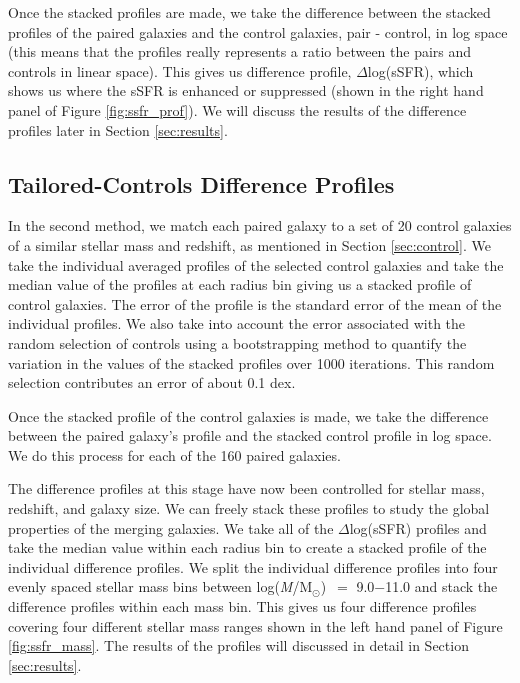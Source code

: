 \documentclass[iop,revtex4,twocolumn,apj,numberedappendix,appendixfloats]{emulateapj}
\newcommand{\logm}{log({\it M}/M$_{\odot}$)}
\begin{document}
Once the stacked profiles are made, we take the difference between the stacked profiles of the paired galaxies and the control galaxies, pair - control, in log space (this means that the profiles really represents a ratio between the pairs and controls in linear space). This gives us difference profile, $\Delta$log(sSFR), which shows us where the sSFR is enhanced or suppressed (shown in the right hand panel of Figure \ref{fig:ssfr_prof}). We will discuss the results of the difference profiles later in Section \ref{sec:results}.

\subsection{Tailored-Controls Difference Profiles}\label{sec:tailored}

In the second method, we match each paired galaxy to a set of 20 control galaxies of a similar stellar mass and redshift, as mentioned in Section \ref{sec:control}. We take the individual averaged profiles of the selected control galaxies and take the median value of the profiles at each radius bin giving us a stacked profile of control galaxies. The error of the profile is the standard error of the mean of the individual profiles. We also take into account the error associated with the random selection of controls using a bootstrapping method to quantify the variation in the values of the stacked profiles over 1000 iterations. This random selection contributes an error of about 0.1 dex.

Once the stacked profile of the control galaxies is made, we take the difference between the paired galaxy's profile and the stacked control profile in log space. We do this process for each of the 160 paired galaxies. 

The difference profiles at this stage have now been controlled for stellar mass, redshift, and galaxy size. We can freely stack these profiles to study the global properties of the merging galaxies. We take all of the $\Delta$log(sSFR) profiles and take the median value within each radius bin to create a stacked profile of the individual difference profiles. We split the individual difference profiles into four evenly spaced stellar mass bins between \logm\ $=$ 9.0$-$11.0 and stack the difference profiles within each mass bin. This gives us four difference profiles covering four different stellar mass ranges shown in the left hand panel of Figure \ref{fig:ssfr_mass}. The results of the profiles will discussed in detail in Section \ref{sec:results}.
\end{document}
